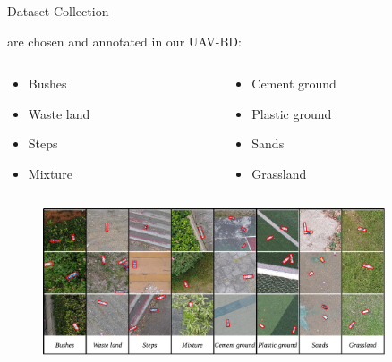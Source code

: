 \documentclass[newPxFont, fullfooter, sectionpages, progressbar]{beamer}
\begin{document}

\begin{frame}{Dataset Collection}

	 are chosen and annotated in our UAV-BD:

	\begin{columns}[c]
		\begin{column}{0.3\textwidth}
			\begin{itemize}
			\item \small{Bushes}
			\item \small{Waste land}
			\item \small{Steps}
			\item \small{Mixture}
			\end{itemize}
		\end{column}

		\begin{column}{0.3\textwidth}
			\begin{itemize}
			\item \small{Cement ground}
			\item \small{Plastic ground}
			\item \small{Sands}
			\item \small{Grassland}
			\end{itemize}
		\end{column}
	\end{columns}
	\begin{figure}
		\centering
		\includegraphics[width=0.9\textwidth]{images/dataset2.png}
	\end{figure}
\end{frame}

\end{document}
